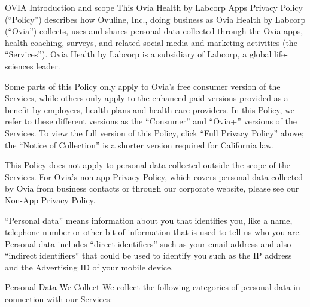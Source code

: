 OVIA
Introduction and scope
This Ovia Health by Labcorp Apps Privacy Policy (“Policy”) describes how Ovuline, Inc., doing business as Ovia Health by Labcorp (“Ovia”) collects, uses and shares personal data collected through the Ovia apps, health coaching, surveys, and related social media and marketing activities (the “Services”). Ovia Health by Labcorp is a subsidiary of Labcorp, a global life-sciences leader.

Some parts of this Policy only apply to Ovia’s free consumer version of the Services, while others only apply to the enhanced paid versions provided as a benefit by employers, health plans and health care providers. In this Policy, we refer to these different versions as the “Consumer” and “Ovia+” versions of the Services. To view the full version of this Policy, click “Full Privacy Policy” above; the “Notice of Collection” is a shorter version required for California law.

This Policy does not apply to personal data collected outside the scope of the Services. For Ovia’s non-app Privacy Policy, which covers personal data collected by Ovia from business contacts or through our corporate website, please see our Non-App Privacy Policy.

“Personal data” means information about you that identifies you, like a name, telephone number or other bit of information that is used to tell us who you are. Personal data includes “direct identifiers” such as your email address and also “indirect identifiers” that could be used to identify you such as the IP address and the Advertising ID of your mobile device.

Personal Data We Collect
We collect the following categories of personal data in connection with our Services:

